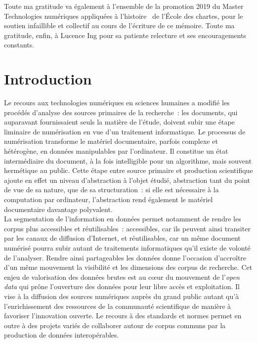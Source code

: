 \documentclass[a4paper,12pt,twoside]{book}
\newcommand{\clearemptydoublepage}{\newpage{\pagestyle{empty}\cleardoublepage}}
\newcommand\mychapter[1]{%
  \chapter*{#1}%
  \markright{\MakeUppercase{#1}}%
}
\newcommand{\eng}{\emph}
\newcommand{\g}[1]{\og#1~\fg}
\begin{document}
	Toute ma gratitude va également à l'ensemble de la promotion 2019 du Master \g{Technologies numériques appliquées à l'histoire} de l'École des chartes, pour le soutien infaillible et collectif au cours de l'écriture de ce mémoire. Toute ma gratitude, enfin, à Lucence Ing pour sa patiente relecture et ses encouragements constants.

\clearemptydoublepage
	
	\printbibliography[keyword={astronomie},title={Histoire de l'astronomie}]
	\printbibliography[keyword={numerique},title={Humanités numériques}]
	\printbibliography[keyword={dataviz},title={Visualisations de données}]
	\printbibliography[keyword={technique},title={Technologies et méthodes}]

\clearemptydoublepage
	
	\mychapter{Introduction}
	
Le recours aux technologies numériques en sciences humaines a modifié les procédés d'analyse des sources primaires de la recherche~: les documents, qui auparavant fournissaient seuls la matière de l'étude, doivent subir une étape liminaire de numérisation en vue d'un traitement informatique. Le processus de numérisation transforme le matériel documentaire, parfois complexe et hétérogène, en données manipulables par l'ordinateur. Il constitue un état intermédiaire du document, à la fois intelligible pour un algorithme, mais souvent hermétique au public. Cette étape entre source primaire et production scientifique ajoute en effet un niveau d'abstraction à l'objet étudié, abstraction tant du point de vue de sa nature, que de sa structuration~: si elle est nécessaire à la computation par ordinateur, l'abstraction rend également le matériel documentaire davantage polyvalent.\\

La segmentation de l'information en données permet notamment de rendre les corpus plus accessibles et réutilisables~: accessibles, car ils peuvent ainsi transiter par les canaux de diffusion d'Internet, et réutilisables, car un même document numérisé pourra subir autant de traitements informatiques qu'il existe de volonté de l'analyser. Rendre ainsi partageables les données donne l'occasion d'accroître d'un même mouvement la visibilité et les dimensions des corpus de recherche. Cet enjeu de valorisation des données brutes est au cœur du mouvement de l'\eng{open data} qui prône l'ouverture des données pour leur libre accès et exploitation. Il vise à la diffusion des sources numériques auprès du grand public autant qu'à l'enrichissement des ressources de la communauté scientifique de manière à favoriser l'innovation ouverte. Le recours à des standards et normes permet en outre à des projets variés de collaborer autour de corpus communs par la production de données interopérables.\\
\end{document}
